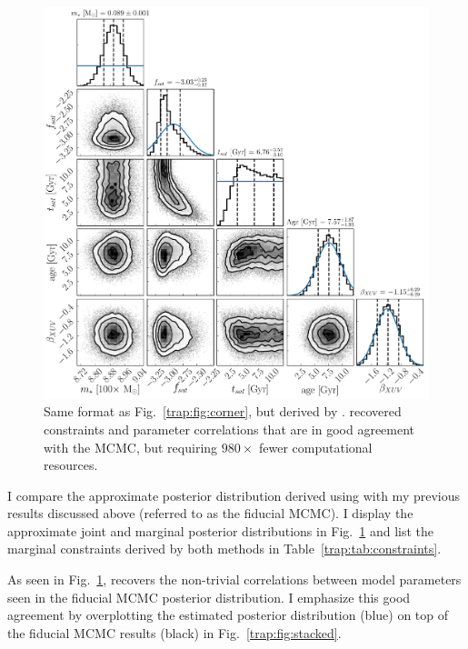 \begin{figure}
\centering
	\includegraphics[width=\textwidth]{apCorner.pdf}
   \caption{Same format as Fig.~\ref{trap:fig:corner}, but derived by \approxposterior. \approxposterior recovered constraints and parameter correlations that are in good agreement with the \emcee MCMC, but requiring $980\times$ fewer computational resources.}%
    \label{trap:fig:approx}%
\end{figure}

I compare the approximate posterior distribution derived using \approxposterior with my previous results discussed above (referred to as the fiducial MCMC). I display the approximate joint and marginal posterior distributions in Fig.~\ref{trap:fig:approx} and list the marginal constraints derived by both methods in Table~\ref{trap:tab:constraints}.

As seen in Fig.~\ref{trap:fig:approx}, \approxposterior recovers the non-trivial correlations between model parameters seen in the fiducial MCMC posterior distribution. I emphasize this good agreement by overplotting the \approxposterior estimated posterior distribution (blue) on top of the fiducial MCMC results (black) in Fig.~\ref{trap:fig:stacked}.

